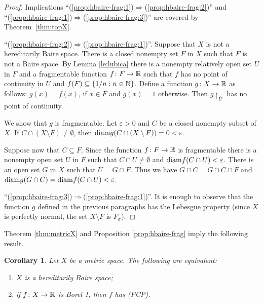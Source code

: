 \documentclass[a4paper]{amsart}
\theoremstyle{plain}
\newtheorem{corollary}[theorem]{Corollary}
\theoremstyle{definition}
\theoremstyle{remark}
\numberwithin{equation}{section}
\begin{document}
 \begin{proof} 
      Implications ``(\ref{prop:hbaire-frag:1})$\Rightarrow$(\ref{prop:hbaire-frag:2})''
      and ``(\ref{prop:hbaire-frag:1})$\Rightarrow$(\ref{prop:hbaire-frag:3})''
      are covered by Theorem~\ref{thm:topX}. 
 
 ``(\ref{prop:hbaire-frag:2})$\Rightarrow$(\ref{prop:hbaire-frag:1})''. Suppose that $X$ is not a hereditarily Baire space. There is a closed nonempty set $F$ in $X$ such that $F$ is not a Baire space. By Lemma \ref{le:lubica} there is a nonempty relatively open set $U$ in   $F$ and a fragmentable function $f\colon F \to \Bbb R$ such that $f$ has no point of continuity in $U$ and $f(F) \subseteq \{1/n: n \in \Bbb N\}$. Define a function $g\colon X \to \Bbb R$ as follows: $g(x) = f(x)$, if $x \in F$ and $g(x) = 1$ otherwise. Then 
 $g\restriction_{\overline U}$ has no point of continuity.
 	

    We show that $g$ is fragmentable.  
    Let $\varepsilon > 0$ and $C$ be a closed nonempty subset of $X$. 
    If $C \cap (X \setminus F) \ne \emptyset$, then ${\rm diam}g(C \cap (X \setminus F)) = 0 < \varepsilon$.

    Suppose now that $C \subseteq F$. Since the  function $f\colon F \to \Bbb R$ is fragmentable 
    there is a nonempty open set $U$ in $F$ such that $C \cap U \ne \emptyset$ and ${\rm diam}f(C \cap U) < \varepsilon$. 
    There is an open set $G$ in $X$ such that $U = G \cap F$. 
    Thus we have $G \cap C = G \cap C \cap F$ and ${\rm diam}g(G \cap C) ={\rm diam}f(C \cap U) < \varepsilon$.

    ``(\ref{prop:hbaire-frag:3})$\Rightarrow$(\ref{prop:hbaire-frag:1})''.
    It is enough to observe that the function $g$ defined in the previous paragraphs 
    has the Lebesgue property (since $X$ is perfectly normal, the set $X\setminus F$ is $F_\sigma$).
 \end{proof}
 
 Theorem \ref{thm:metricX} and Proposition \ref{prop:hbaire-frag} imply the following result.
 \begin{corollary}\label{Cor5}
  Let $X$ be a metric space. The following are equivalent:
 	\begin{enumerate}
 		\item $X$ is a hereditarily  Baire space;
 		\item  if $f\colon X \to \Bbb R$ is Borel 1,  then $f$ has (PCP).
 	\end{enumerate}
 \end{corollary}
\end{document}
